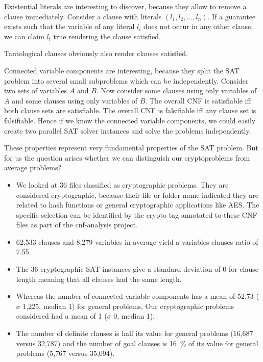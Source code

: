 Existential literals are interesting to discover, because they allow
to remove a clause immediately. Consider a clause with literals
$(l_1, l_2, \ldots, l_n)$. If a guarantee exists such that the variable
of any literal $l_i$ does not occur in any other clause, we can claim
$l_i$ true rendering the clause satisfied.

Tautological clauses obviously also render clauses satisfied.

Connected variable components are interesting, because they split the
SAT problem into several small subproblems which can be independently.
Consider two sets of variables $A$ and $B$. Now consider some clauses
using only variables of $A$ and some clauses using only variables of $B$.
The overall CNF is satisfiable iff both clause sets are satisfiable.
The overall CNF is falsifiable iff any clause set is falsifiable.
Hence if we know the connected variable components, we could easily
create two parallel SAT solver instances and solve the problems
independently.

These properties represent very fundamental properties of the SAT problem.
But for us the question arises whether we can distinguish our cryptoproblems
from average problems?

\begin{itemize}
\item We looked at 36 files classified as cryptographic problems.
  They are considered cryptographic, because their file or folder name
  indicated they are related to hash functions or general cryptographic
  applications like AES. The specific selection can be identified by
  the crypto tag annotated to these CNF files as part of the cnf-analysis
  project.
\item 62,533 clauses and 8,279 variables in average yield a variables-clauses
  ratio of 7.55.
\item The 36 cryptographic SAT instances give a standard deviation of 0
  for clause length meaning that all clauses had the same length.
\item Whereas the number of connected variable components has a mean
  of 52.73 ($\sigma$ 1,225, median 1) for general problems,
  Our cryptographic problems considered had a mean of 1 ($\sigma$ 0, median 1).
\item The number of definite clauses is half its value for general problems
  (16,687 versus 32,787) and the number of goal clauses is 16~\% of its
  value for general problems (5,767 versus 35,094).
\end{itemize}


